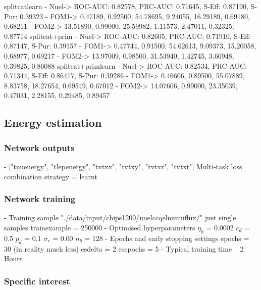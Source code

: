splitcatlearn
- Nuel-> ROC-AUC: 0.82578, PRC-AUC: 0.71645, S-Eff: 0.87190, S-Pur: 0.39323
- FOM1-> 0.47189, 0.92500, 54.78695, 9.24055, 16.29189, 0.69180, 0.68211
- FOM2-> 13.51890, 0.99000, 25.59982, 1.11573, 2.47011, 0.32325, 0.87714
splitcat+prim
- Nuel-> ROC-AUC: 0.82605, PRC-AUC: 0.71910, S-Eff: 0.87147, S-Pur: 0.39157
- FOM1-> 0.47744, 0.91500, 54.62613, 9.09373, 15.20058, 0.68977, 0.69217
- FOM2-> 13.97009, 0.98500, 31.53940, 1.42745, 3.66948, 0.39825, 0.86088
splitcat+primlearn
- Nuel-> ROC-AUC: 0.82534, PRC-AUC: 0.71344, S-Eff: 0.86417, S-Pur: 0.39286
- FOM1-> 0.46606, 0.89500, 55.07889, 8.83758, 18.27654, 0.69549, 0.67012
- FOM2-> 14.07606, 0.99000, 23.35039, 0.47031, 2.28155, 0.29485, 0.89457

\subsection{Energy estimation} %
\label{sec:cvn_specific_energy} %

\subsubsection*{Network outputs} %
- ["tnuenergy", "tlepenergy", "tvtxx", "tvtxy", "tvtxz", "tvtxt"]
Multi-task loss combination strategy = learnt
\subsubsection*{Network training} %
- Training sample
"./data/input/chips1200/nuelccqelnumuflux/" just single samples
trainexample = 250000
- Optimised hyperparameters
$\eta_{0}$ = 0.0002
$c_{d}$ = 0.5
$p_{d}$ = 0.1
$\sigma_{r}$ = 0.00
$n_{b}$ = 128
- Epochs and early stopping settings
epochs = 30 (in reality much less)
esdelta = 2
esepochs = 5
- Typical training time
~ 2 Hours
\subsubsection*{Specific interest} %

